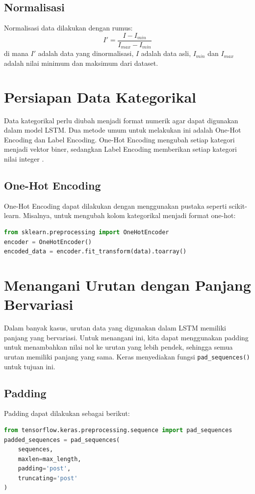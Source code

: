 \subsection{Normalisasi}
\par Normalisasi data dilakukan dengan rumus:
\begin{equation}
    I' = \frac{I - I_{min}}{I_{max} - I_{min}}
\end{equation}
di mana $I'$ adalah data yang dinormalisasi, $I$ adalah data asli, $I_{min}$ dan $I_{max}$ adalah nilai minimum dan maksimum dari dataset.

\section{Persiapan Data Kategorikal}
\par Data kategorikal perlu diubah menjadi format numerik agar dapat digunakan dalam model LSTM. Dua metode umum untuk melakukan ini adalah One-Hot Encoding dan Label Encoding. One-Hot Encoding mengubah setiap kategori menjadi vektor biner, sedangkan Label Encoding memberikan setiap kategori nilai integer \parencite{brownlee2017}.

\subsection{One-Hot Encoding}
\par One-Hot Encoding dapat dilakukan dengan menggunakan pustaka seperti scikit-learn. Misalnya, untuk mengubah kolom kategorikal menjadi format one-hot:
\begin{lstlisting}[language=Python, caption=Contoh One-Hot Encoding (scikit-learn)]
from sklearn.preprocessing import OneHotEncoder
encoder = OneHotEncoder()
encoded_data = encoder.fit_transform(data).toarray()
\end{lstlisting}

\section{Menangani Urutan dengan Panjang Bervariasi}
\par Dalam banyak kasus, urutan data yang digunakan dalam LSTM memiliki panjang yang bervariasi. Untuk menangani ini, kita dapat menggunakan padding untuk menambahkan nilai nol ke urutan yang lebih pendek, sehingga semua urutan memiliki panjang yang sama. Keras menyediakan fungsi \texttt{pad\_sequences()} untuk tujuan ini.

\subsection{Padding}
\par Padding dapat dilakukan sebagai berikut:
\begin{lstlisting}[language=Python, caption=Contoh Padding Sequence (Keras)]
from tensorflow.keras.preprocessing.sequence import pad_sequences
padded_sequences = pad_sequences(
    sequences, 
    maxlen=max_length, 
    padding='post', 
    truncating='post'
)
\end{lstlisting}

